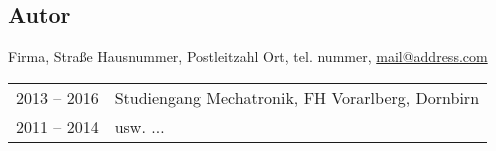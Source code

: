 \documentclass[./\jobname.tex]{subfiles}
\begin{document}
\begin{envMode}[\paper]
%
	\section*{Autor}
	\vskip 9pt
	\noindent
	\begin{minipage}{0.1\columnwidth}%
	\end{minipage}\hspace{5mm}\hfill
	\begin{minipage}{0.9\columnwidth}%
		\supervisorName \supervisorSurname%
		\vskip 9pt%
		Firma, %
		Straße Hausnummer, %
		Postleitzahl Ort, %
		tel. nummer, %
		\href{mailto:mail@address.com}{mail@address.com}%
		\vskip 9pt%
		\begin{tabular}{@{}ll}
			2013 – 2016	& Studiengang Mechatronik, FH Vorarlberg, Dornbirn\\ 
			2011 – 2014	& usw. \(\ldots\)
		\end{tabular}
	\end{minipage}
%
\end{envMode}
\end{document}
